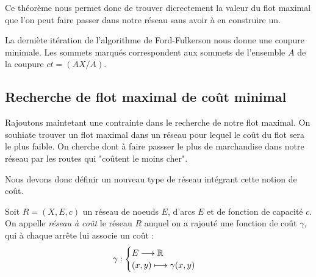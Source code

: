 Ce théorème nous permet donc de trouver dicrectement la valeur du flot maximal que l'on peut faire passer dans 
notre réseau sans avoir à en construire un. 

\begin{remark}
    La derniète itération de l'algorithme de Ford-Fulkerson nous donne une coupure minimale. 
    Les sommets marqués correspondent aux sommets de l'ensemble $A$ de la coupure $ct = (A X/A)$.
\end{remark}

\subsection{Recherche de flot maximal de coût minimal}

Rajoutons maintetant une contrainte dans le recherche de notre flot maximal. On souhiate trouver un flot maximal 
dans un réseau pour lequel le coût du flot sera le plus faible. 
On cherche dont à faire passser le plus de marchandise dans notre réseau par les routes qui "coûtent le moins cher". 

Nous devons donc définir un nouveau type de réseau intégrant cette notion de coût. 

\begin{definition}
    Soit $R = (X, E, c)$ un réseau de noeuds $E$, d'arcs $E$ et de fonction de capacité $c$. 
    On appelle \emph{réseau à coût} le réseau $R$ auquel on a rajouté une fonction de coût $ \gamma$, qui à chaque arrête 
    lui associe un coût : 
        $$ \gamma : 
            \begin{cases}
                E \longrightarrow \mathbb{R} \\ 
                (x,y) \longmapsto \gamma(x,y) 
            \end{cases}
        $$
\end{definition}

